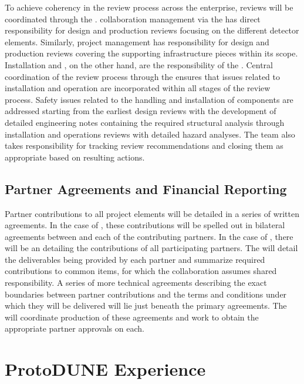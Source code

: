 To achieve coherency in the review process across the
 enterprise, reviews will be coordinated through the
.   collaboration management via the
 has direct responsibility for design and production
reviews focusing on the different detector elements.  Similarly,
 project management has responsibility for design and
production reviews covering the supporting infrastructure pieces
within its scope.  Installation and , on the other hand,
are the responsibility of the .  Central coordination of
the review process through the  ensures that issues related
to installation and operation are incorporated within all stages of
the review process.  Safety issues related to the handling and
installation of components are addressed starting from the earliest
design reviews with the development of detailed engineering notes
containing the required structural analysis through installation and
operations reviews with detailed hazard analyses.  The  team
also takes responsibility for tracking review recommendations and
closing them as appropriate based on resulting actions.

\subsection{Partner Agreements and Financial Reporting}
\label{sec:dune_agreements}

Partner contributions to all project elements will be detailed 
in a series of written agreements.  In the case of , 
these contributions will be spelled out in bilateral agreements 
between  and each of the contributing partners.  In 
the case of , there will be an  
detailing the contributions of all participating partners.  The 
 will detail the deliverables being provided by each 
partner and summarize required contributions to common items, 
for which the collaboration assumes shared responsibility.  
A series of more technical agreements describing the exact 
boundaries between partner contributions and the terms and 
conditions under which they will be delivered will lie just 
beneath the primary agreements.  The  will coordinate 
production of these agreements and work to obtain the appropriate 
partner approvals on each.  

\section{ProtoDUNE Experience}
\label{sec:dune_protodune}

